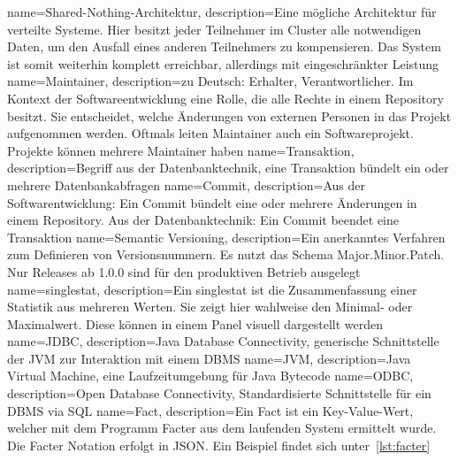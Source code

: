 {
  name=Shared-Nothing-Architektur,
  description={Eine mögliche Architektur für verteilte Systeme. Hier besitzt
               jeder Teilnehmer im Cluster alle notwendigen Daten, um den
               Ausfall eines anderen Teilnehmers zu kompensieren. Das
               System ist somit weiterhin komplett erreichbar, allerdings mit
               eingeschränkter Leistung}
}
{
  name=Maintainer,
  description={zu Deutsch: Erhalter, Verantwortlicher. Im Kontext der
               Softwareentwicklung eine Rolle, die alle Rechte in einem
               \gls{Repository} besitzt. Sie entscheidet, welche Änderungen von
               externen Personen in das Projekt aufgenommen werden. Oftmals
               leiten Maintainer auch ein Softwareprojekt. Projekte können
               mehrere Maintainer haben}
}
{
  name=Transaktion,
  description={Begriff aus der Datenbanktechnik, eine Transaktion bündelt ein
               oder mehrere Datenbankabfragen}
}
{
  name=Commit,
  description={Aus der Softwarentwicklung: Ein Commit bündelt eine oder mehrere
               Änderungen in einem \gls{Repository}. Aus der Datenbanktechnik:
               Ein Commit beendet eine \gls{Transaktion}}
}
{
  name={Semantic Versioning},
  description={Ein anerkanntes Verfahren zum Definieren von Versionsnummern. Es
               nutzt das Schema Major.Minor.Patch. Nur Releases ab 1.0.0 sind
               für den produktiven Betrieb ausgelegt~\cite{semver}}
}
{
  name={singlestat},
  description={Ein singlestat ist die Zusammenfassung einer Statistik aus
               mehreren Werten. Sie zeigt hier wahlweise den Minimal- oder
               Maximalwert. Diese können in einem Panel visuell dargestellt
               werden}
}
{
  name=JDBC,
  description={Java Database Connectivity, generische Schnittstelle der JVM zur
               Interaktion mit einem \gls{DBMS}}
}
{
  name=JVM,
  description={Java Virtual Machine, eine Laufzeitumgebung für Java Bytecode}
}
{
  name=ODBC,
  description={Open Database Connectivity, Standardisierte Schnittstelle für
               ein \gls{DBMS} via \gls{SQL}}
}
{
  name=Fact,
  description={Ein Fact ist ein Key-Value-Wert, welcher mit dem Programm Facter
               aus dem laufenden System ermittelt wurde. Die Facter Notation
               erfolgt in \gls{JSON}. Ein Beispiel findet sich
               unter~\ref{lst:facter}}
}
